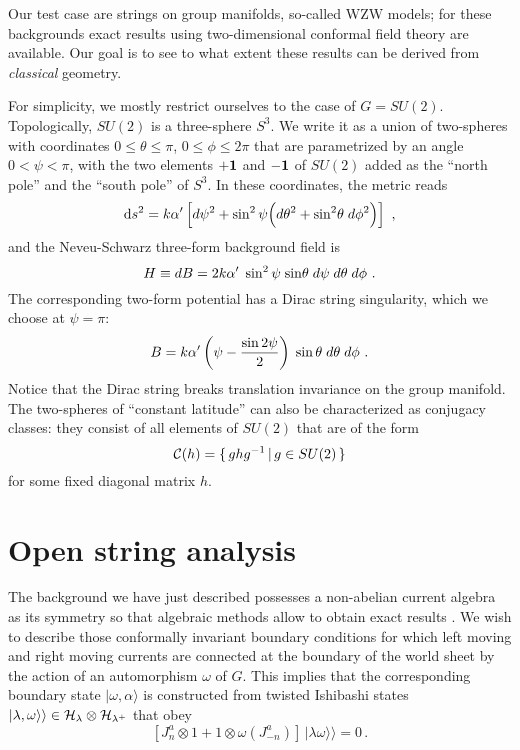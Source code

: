\documentclass[a4paper,12pt]{article} \usepackage{amssymb,amsfonts,latexsym}
\begin{document}
Our test case are strings on group manifolds, so-called WZW models;
for these backgrounds exact results using two-dimensional conformal
field theory are available. Our goal is to see to what extent these results 
can be derived from {\em classical} geometry. 

For simplicity, we mostly restrict ourselves to the case of $G=SU(2)$. 
Topologically, $SU(2)$ is a three-sphere $S^3$. We write it as a union of 
two-spheres with coordinates $0\leq\theta\leq\pi$, $0\leq\phi\leq2\pi$ that are 
parametrized by an angle $0<\psi<\pi$, with the two elements $+\bf 1$ and 
$-\bf 1$ of $SU(2)$ added as the ``north pole'' and the ``south pole'' of 
$S^3$. In these coordinates, the metric reads
$$ {\rm d} s^2 = k\alpha^\prime \left[ d\psi^2 + \sin^2\psi \Bigl( d\theta^2 +
{\rm sin}^2\theta\;  d\phi^2 \Bigr)\right]\ , $$
and the Neveu-Schwarz three-form  background field is 
$$ H  \equiv {dB} = {2k\alpha^\prime}\; \sin^2\psi\;
{\rm sin}\theta\; d\psi\; d\theta\; d\phi\ . $$
The corresponding two-form potential has a Dirac string singularity,
which we choose at $\psi=\pi$:
\begin{equation} B =  k\alpha^\prime
\left( \psi - {\sin2\psi\over 2}\right)\;
\sin\theta\; d\theta\; d\phi \ . \label B \end{equation}
Notice that the Dirac string breaks translation invariance on the group
manifold. The two-spheres of ``constant latitude'' can also be characterized as
conjugacy classes: they consist of all elements of $SU(2)$ that are
of the form 
$$ {\cal C} (h) = \{ \, g h g^{-1} \,|\, g\in SU(2) \,\} $$
for some fixed diagonal matrix $h$.

\section{Open string analysis}

The background we have just described possesses a non-abelian current algebra
as its symmetry so that algebraic methods allow to obtain exact results 
\cite{fffs}. We wish to describe those
conformally invariant boundary conditions for which left moving and right
moving currents are connected at the boundary of the world sheet by the
action of an automorphism $\omega$ of $G$. This implies that the corresponding
boundary state $|\omega,\alpha\rangle$ is constructed from twisted 
Ishibashi states $|\lambda,\omega\rangle\rangle\in{\cal H}_\lambda\otimes
{\cal H}_{\lambda^+}$ that obey
$$ [J^a_n \otimes 1 + 1\otimes \omega(J^a_{-n}) ] \,
|\lambda\omega\rangle\rangle = 0 \, . $$
\end{document}
